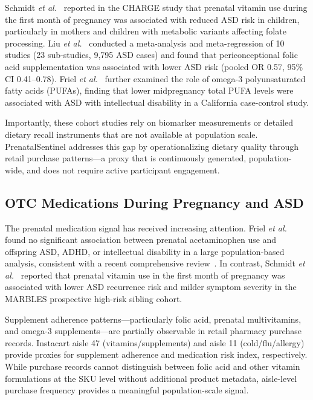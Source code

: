 \documentclass[journal]{IEEEtran}
\newcommand{\etal}{\textit{et al.}}
\begin{document}
Schmidt \etal~\cite{schmidt2012prenatal} reported in the CHARGE study
that prenatal vitamin use during the first month of pregnancy was
associated with reduced ASD risk in children, particularly in mothers
and children with metabolic variants affecting folate processing.
Liu \etal~\cite{liu2021folicacid} conducted a meta-analysis and
meta-regression of 10 studies (23 sub-studies, 9,795 ASD cases) and
found that periconceptional folic acid supplementation was
associated with lower ASD risk (pooled OR 0.57, 95\% CI 0.41--0.78).
Friel \etal~\cite{friel2021prenatal} further
examined the role of omega-3 polyunsaturated fatty acids (PUFAs),
finding that lower midpregnancy total PUFA levels were associated with
ASD with intellectual disability in a California case-control study.

Importantly, these cohort studies rely on biomarker measurements or
detailed dietary recall instruments that are not available at population
scale. PrenatalSentinel addresses this gap by operationalizing
dietary quality through retail purchase patterns---a proxy that is
continuously generated, population-wide, and does not require active
participant engagement.

\subsection{OTC Medications During Pregnancy and ASD}

The prenatal medication signal has received increasing attention.
Friel \etal~\cite{friel2021prenatal} found no significant association
between prenatal acetaminophen use and offspring ASD, ADHD, or
intellectual disability in a large population-based analysis,
consistent with a recent comprehensive review~\cite{worringer2024acetaminophen}.
In contrast, Schmidt \etal~\cite{schmidt2019prenatal} reported that
prenatal vitamin use in the first month of pregnancy was associated
with lower ASD recurrence risk and milder symptom severity in the
MARBLES prospective high-risk sibling cohort.

Supplement adherence patterns---particularly folic acid, prenatal
multivitamins, and omega-3 supplements---are partially observable
in retail pharmacy purchase records. Instacart aisle 47
(vitamins/supplements) and aisle 11 (cold/flu/allergy) provide
proxies for supplement adherence and medication risk index,
respectively. While purchase records cannot distinguish between
folic acid and other vitamin formulations at the SKU level without
additional product metadata, aisle-level purchase frequency provides
a meaningful population-scale signal.
\end{document}
